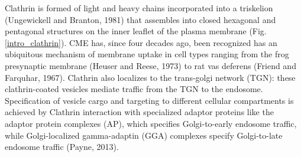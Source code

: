 \vspace{5mm}
Clathrin is formed of light and heavy chains incorporated into a triskelion (Ungewickell and Branton, 1981) that assembles into closed hexagonal and pentagonal structures on the inner leaflet of the plasma membrane (Fig.\ref{intro_clathrin}). CME has, since four decades ago, been recognized has an ubiquitous mechanism of membrane uptake in cell types ranging from the frog presynaptic membrane (Heuser and Reese, 1973) to rat vas deferens (Friend and Farquhar, 1967). Clathrin also localizes to the trans-golgi network (TGN): these clathrin-coated vesicles mediate traffic from the TGN to the endosome. Specification of vesicle cargo and targeting to different cellular compartments is achieved by Clathrin interaction with specialized adaptor proteins like the adaptor protein complexes (AP), which specifies Golgi-to-early endosome traffic, while Golgi-localized gamma-adaptin (GGA) complexes specify Golgi-to-late endosome traffic (Payne, 2013). 



